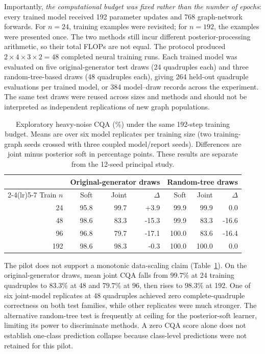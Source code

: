 \documentclass[10pt]{article}
\begin{document}
Importantly, \emph{the computational budget was fixed rather than the number of epochs}: every trained model received 192 parameter updates and 768 graph-network forwards. For $n=24$, training examples were revisited; for $n=192$, the examples were presented once. The two methods still incur different posterior-processing arithmetic, so their total FLOPs are not equal. The protocol produced $2\times4\times3\times2=48$ completed neural training runs. Each trained model was evaluated on five original-generator test draws (24 quadruples each) and three random-tree-based draws (48 quadruples each), giving 264 held-out quadruple evaluations per trained model, or 384 model--draw records across the experiment. The same test draws were reused across sizes and methods and should not be interpreted as independent replications of new graph populations.

\begin{table}[H]
\centering\small
\caption{Exploratory heavy-noise CQA (\%) under the same 192-step training budget. Means are over six model replicates per training size (two training-graph seeds crossed with three coupled model/report seeds). Differences are joint minus posterior soft in percentage points. These results are separate from the 12-seed principal study.}
\label{tab:scale}
\begin{tabular}{r rrr rrr}
\toprule
& \multicolumn{3}{c}{Original-generator draws} & \multicolumn{3}{c}{Random-tree draws}\\
\cmidrule(lr){2-4}\cmidrule(lr){5-7}
Train $n$ & Soft & Joint & $\Delta$ & Soft & Joint & $\Delta$\\
\midrule
24  & 95.8 & 99.7 & +3.9  & 99.9 & 99.9 & 0.0\\
48  & 98.6 & 83.3 & -15.3 & 99.9 & 83.3 & -16.6\\
96  & 96.8 & 79.7 & -17.1 & 100.0 & 83.6 & -16.4\\
192 & 98.6 & 98.3 & -0.3  & 100.0 & 100.0 & 0.0\\
\bottomrule
\end{tabular}
\end{table}

The pilot does not support a monotonic data-scaling claim (Table~\ref{tab:scale}). On the original-generator draws, mean joint CQA falls from $99.7\%$ at 24 training quadruples to $83.3\%$ at 48 and $79.7\%$ at 96, then rises to $98.3\%$ at 192. One of six joint-model replicates at 48 quadruples achieved zero complete-quadruple correctness on both test families, while other replicates were much stronger. The alternative random-tree test is frequently at ceiling for the posterior-soft learner, limiting its power to discriminate methods. A zero CQA score alone does not establish one-class prediction collapse because class-level predictions were not retained for this pilot.
\end{document}
